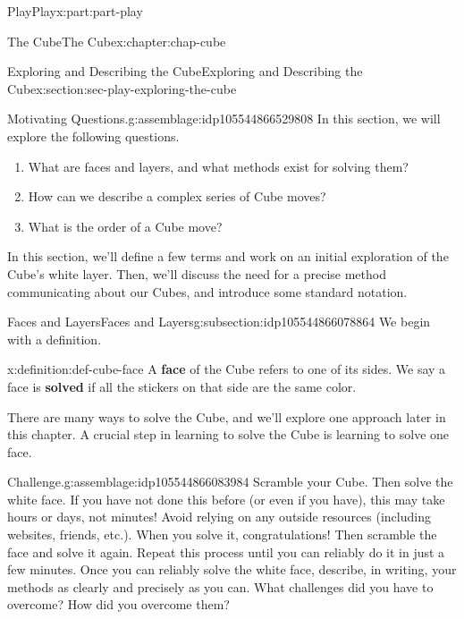 \documentclass[oneside,10pt,]{book}
\newcommand{\terminology}[1]{\textbf{#1}}
\numberwithin{equation}{section}
\begin{document}
\begin{partptx}{Play}{}{Play}{}{}{x:part:part-play}
\begin{chapterptx}{The Cube}{}{The Cube}{}{}{x:chapter:chap-cube}
\typeout{************************************************}
%
\begin{sectionptx}{Exploring and Describing the Cube}{}{Exploring and Describing the Cube}{}{}{x:section:sec-play-exploring-the-cube}
\begin{assemblage}{Motivating Questions.}{g:assemblage:idp105544866529808}%
In this section, we will explore the following questions. %
\begin{enumerate}
\item{}What are faces and layers, and what methods exist for solving them?%
\item{}How can we describe a complex series of Cube moves?%
\item{}What is the order of a Cube move?%
\end{enumerate}
%
\end{assemblage}
\begin{introduction}{}%
In this section, we'll define a few terms and work on an initial exploration of the Cube's white layer. Then, we'll discuss the need for a precise method communicating about our Cubes, and introduce some standard notation.%
\end{introduction}%
%
%
\typeout{************************************************}
\typeout{************************************************}
%
\begin{subsectionptx}{Faces and Layers}{}{Faces and Layers}{}{}{g:subsection:idp105544866078864}
We begin with a definition.%
\begin{definition}{}{x:definition:def-cube-face}%
%
A \terminology{face} of the Cube refers to one of its sides. We say a face is \terminology{solved} if all the stickers on that side are the same color.%
\end{definition}
There are many ways to solve the Cube, and we'll explore one approach later in this chapter. A crucial step in learning to solve the Cube is learning to solve one face.%
\begin{assemblage}{Challenge.}{g:assemblage:idp105544866083984}%
Scramble your Cube. Then solve the white face. If you have not done this before (or even if you have), this may take hours or days, not minutes! Avoid relying on any outside resources (including websites, friends, etc.). When you solve it, congratulations! Then scramble the face and solve it again. Repeat this process until you can reliably do it in just a few minutes. Once you can reliably solve the white face, describe, in writing, your methods as clearly and precisely as you can. What challenges did you have to overcome? How did you overcome them?%

\end{assemblage}
\end{subsectionptx}
\end{sectionptx}
\end{chapterptx}
\end{partptx}
\end{document}

